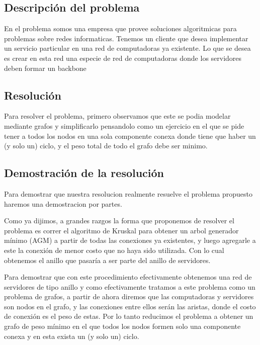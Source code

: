 \subsection{Descripci\'on del problema}

En el problema somos una empresa que provee soluciones algoritmicas para problemas sobre redes informaticas. Tenemos un cliente que desea implementar un servicio particular en una red de computadoras ya existente.
Lo que se desea es crear en esta red una especie de red de computadoras donde los servidores deben formar un backbone 

\subsection{Resoluci\'on}

Para resolver el problema, primero observamos que este se podia modelar mediante grafos y simplificarlo pensandolo como un ejercicio en el que se pide tener a todos los nodos en una sola componente conexa donde tiene que haber un (y solo un) ciclo, y el peso total de todo el grafo debe ser minimo.



\subsection{Demostraci\'on de la resoluci\'on}

Para demostrar que nuestra resolucion realmente resuelve el problema propuesto haremos una demostracion por partes.

Como ya dijimos, a grandes razgos la forma que proponemos de resolver el problema es correr el algoritmo de Kruskal para obtener un arbol generador mínimo (AGM) a partir de todas las conexiones ya existentes, y luego agregarle a este la conexión de menor costo que no haya sido utilizada. Con lo cual obtenemos el anillo que pasaría a ser parte del anillo de servidores.

Para demostrar que con este procedimiento efectivamente obtenemos una red de servidores de tipo anillo y como efectivamente tratamos a este problema como un problema de grafos, a partir de ahora diremos que las computadoras y servidores son nodos en el grafo, y las conexiones entre ellos serán las aristas, donde el costo de conexión es el peso de estas. Por lo tanto reducimos el problema a obtener un grafo de peso mínimo en el que todos los nodos formen solo una componente conexa y en esta exista un (y solo un) ciclo.

